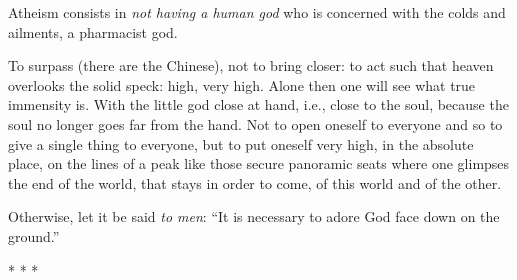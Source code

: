 Atheism consists in \emph{not having a human god} who is concerned with the colds and ailments, a pharmacist god.

To surpass (there are the Chinese), not to bring closer: to act such that heaven overlooks the solid speck: high, very high. Alone then one will see what true immensity is. With the little god close at hand, i.e., close to the soul, because the soul no longer goes far from the hand. Not to open oneself to everyone and so to give a single thing to everyone, but to put oneself very high, in the absolute place, on the lines of a peak like those secure panoramic seats where one glimpses the end of the world, that stays in order to come, of this world and of the other.

Otherwise, let it be said \emph{to men}: ``It is necessary to adore God face down on the ground.''



\begin{center}* * *\end{center}

